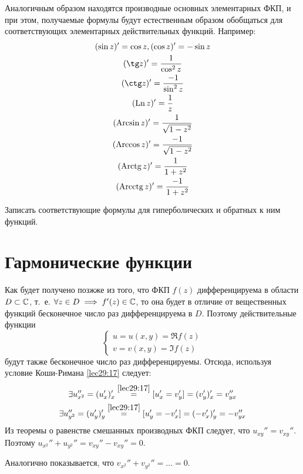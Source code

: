 \documentclass[../../main.tex]{subfiles}
\begin{document}
Аналогичным образом находятся производные основных элементарных ФКП, 
и при этом, получаемые формулы будут естественным образом обобщаться для
соответствующих элементарных действительных функций. Например:
\[
\begin{gathered}
(\sin z)' = \cos z, (\cos z)' = -\sin z\\
(\tg z)' = \dfrac{1}{\cos^2 z}\\ 
(\ctg z)' = \dfrac{-1}{\sin^2 z}\\
(\Ln z)' = \dfrac{1}{z}\\
(\Arcsin z)' = \dfrac{1}{\sqrt{1 - z^2}}\\
(\Arccos z)' = \dfrac{-1}{\sqrt{1 - z^2}}\\
(\Arctg z)' = \dfrac{1}{1 + z^2}\\
(\Arcctg z)' = \dfrac{-1}{1 + z^2}
\end{gathered}
\]
\begin{exc}
	Записать соответствующие формулы для гиперболических 
	и обратных к ним функций.
\end{exc}

\section{Гармонические функции}

Как будет получено позжже из того, что ФКП $ f(z) $ дифференцируема в области
$ D \subset \mathbb{C} $, т.~е. $ \forall z \in D \implies f'(z) \in \mathbb{C} $, то она будет
в отличие от вещественных функций бесконечное число раз дифференцируема в $ D $.
Поэтому действительные функции 
\[
\begin{cases}
	u = u(x, y) = \Re f(z)\\
	v = v(x, y) = \Im f(z)
\end{cases}
\]
будут также бесконечное число раз дифференцируемы. Отсюда, используя условие
Коши-Римана \eqref{lec29:17} следует:
\[
\begin{gathered}
\exists u_{x^2}'' = (u_x')_x' 
\stackrel{\eqref{lec29:17}}{=}
[u_x' = v_y'] = (v_y')_x' = v_{yx}''\\
\exists u_{y^2}'' = (u_y')_y' 
\stackrel{\eqref{lec29:17}}{=}
[u_y' = -v_x'] = (-v_x')_y' = -v_{yx}''\\
\end{gathered}
\]
Из теоремы о равенстве смешанных производных ФКП следует, что 
$ u_{xy}'' = v_{xy}'' $. Поэтому $ u_{x^2}'' + u_{y^2}'' = v_{xy}'' - v_{xy}'' = 0 $.

Аналогично показывается, что $ v_{x^2}'' + v_{y^2}'' = \dots = 0 $.
\end{document}
